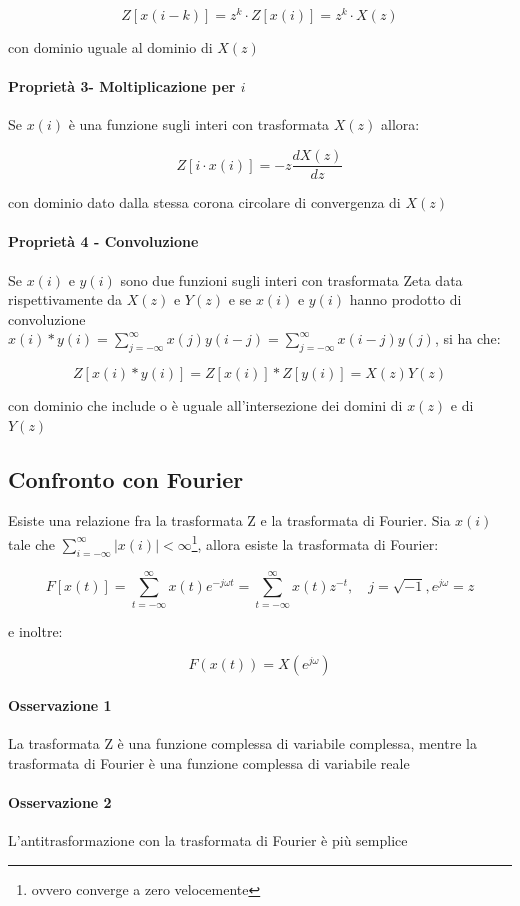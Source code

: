   \[ Z[x(i-k)]=z^k\cdot Z[x(i)]=z^k\cdot X(z) \]
  
con dominio uguale al dominio di $X(z)$
\paragraph{Proprietà 3- Moltiplicazione per $i$} Se $x(i)$ è una funzione sugli interi con trasformata $X(z)$ allora:

  \[ Z[i \cdot x(i)]=-z\frac{dX(z)}{dz} \]
  
con dominio dato dalla stessa corona circolare di convergenza di $X(z)$
\paragraph{Proprietà 4 - Convoluzione} Se $x(i)$ e $y(i)$ sono due funzioni sugli interi con trasformata Zeta data rispettivamente da $X(z)$ e $Y(z)$ e se $x(i)$ e $y(i)$ hanno prodotto di convoluzione $x(i) \ast y(i) = \sum_{j=-\infty}^{\infty} {x(j)y(i-j)} = \sum_{j=-\infty}^{\infty} {x(i-j)y(j)}$, si ha che:

  \[ Z[x(i)\ast y(i)]=Z[x(i)]\ast Z[y(i)]=X(z)Y(z) \]
  
con dominio che include o è uguale all'intersezione dei domini di $x(z)$ e di $Y(z)$
\subsection{Confronto con Fourier}
Esiste una relazione fra la trasformata Z e la trasformata di Fourier. Sia $x(i)$ tale che $\sum_{i=-\infty}^{\infty} {|x(i)|}<\infty$\footnote{ovvero converge a zero velocemente}, allora esiste la trasformata di Fourier:

  \[ F[x(t)]=\sum_{t=-\infty}^{\infty}{x(t)e^{-j\omega t}}=\sum_{t=-\infty}^{\infty}{x(t)z^{-t}}, \quad j=\sqrt{-1},e^{j\omega}=z \]
  
\noindent e inoltre:

  \[ F(x(t))=X(e^{j\omega}) \]
  
\paragraph{Osservazione 1} La trasformata Z è una funzione complessa di variabile complessa, mentre la trasformata di Fourier è una funzione complessa di variabile reale
\paragraph{Osservazione 2} L'antitrasformazione con la trasformata di Fourier è più semplice
